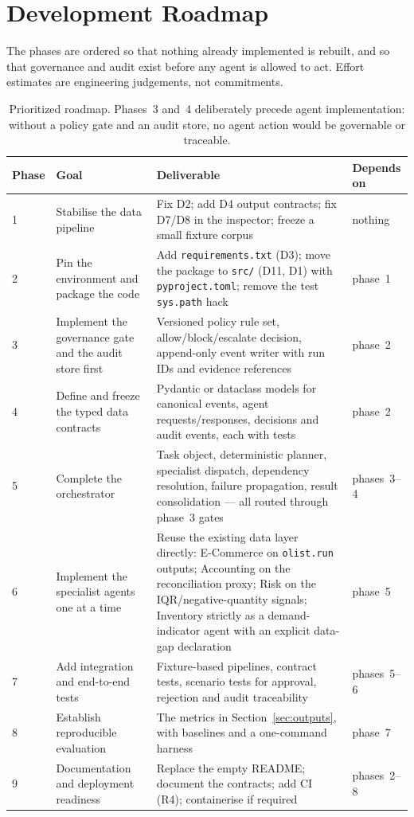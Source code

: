 \documentclass[11pt,a4paper]{article}
\newcommand{\code}[1]{\texttt{#1}}
\begin{document}
\section{Development Roadmap}
\label{sec:roadmap}
The phases are ordered so that nothing already implemented is rebuilt, and so that governance and audit exist before any agent is allowed to act. Effort estimates are engineering judgements, not commitments.

\begin{table}[H]
\centering
\small
\begin{tabularx}{\textwidth}{L{1.1cm}L{4.3cm}L{4.4cm}X}
\toprule
\textbf{Phase} & \textbf{Goal} & \textbf{Deliverable} & \textbf{Depends on} \\
 & Stabilise the data pipeline & Fix D2; add D4 output contracts; fix D7/D8 in the inspector; freeze a small fixture corpus & nothing \\
2 & Pin the environment and package the code & Add \code{requirements.txt} (D3); move the package to \code{src/} (D11, D1) with \code{pyproject.toml}; remove the test \code{sys.path} hack & phase~1 \\
3 & Implement the governance gate and the audit store first & Versioned policy rule set, allow/block/escalate decision, append-only event writer with run IDs and evidence references & phase~2 \\
4 & Define and freeze the typed data contracts & Pydantic or dataclass models for canonical events, agent requests/responses, decisions and audit events, each with tests & phase~2 \\
5 & Complete the orchestrator & Task object, deterministic planner, specialist dispatch, dependency resolution, failure propagation, result consolidation --- all routed through phase~3 gates & phases~3--4 \\
6 & Implement the specialist agents one at a time & Reuse the existing data layer directly: E-Commerce on \code{olist.run} outputs; Accounting on the reconciliation proxy; Risk on the IQR/negative-quantity signals; Inventory strictly as a demand-indicator agent with an explicit data-gap declaration & phase~5 \\
7 & Add integration and end-to-end tests & Fixture-based pipelines, contract tests, scenario tests for approval, rejection and audit traceability & phases~5--6 \\
8 & Establish reproducible evaluation & The metrics in Section~\ref{sec:outputs}, with baselines and a one-command harness & phase~7 \\
9 & Documentation and deployment readiness & Replace the empty README; document the contracts; add CI (R4); containerise if required & phases~2--8 \\
\bottomrule
\end{tabularx}
\caption{Prioritized roadmap. Phases~3 and~4 deliberately precede agent implementation: without a policy gate and an audit store, no agent action would be governable or traceable.}
\label{tab:roadmap}
\end{table}
\end{document}
